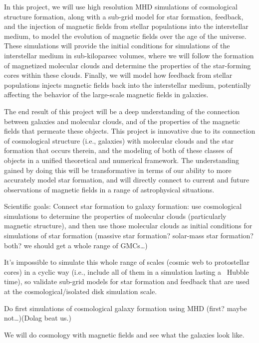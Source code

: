 In this project, we will use high resolution MHD simulations of
cosmological structure formation, along with a sub-grid model for star
formation, feedback, and the injection of magnetic fields from stellar
populations into the interstellar medium, to model the evolution of
magnetic fields over the age of the universe.  These simulations will
provide the initial conditions for simulations of the
interstellar medium in sub-kiloparsec volumes, where we will follow
the formation of magnetized molecular clouds and determine the
properties of the star-forming cores within these clouds.  Finally, we
will model how feedback from stellar populations injects magnetic
fields back into the interstellar medium, potentially affecting the
behavior of the large-scale magnetic fields in galaxies.

The end result of this project will be a deep understanding of the
connection between galaxies and molecular clouds, and of the
properties of the magnetic fields that permeate these objects.  This
project is innovative due to its connection of cosmological structure
(i.e., galaxies) with molecular clouds and the star formation that
occurs therein, and the modeling of both of these classes of objects
in a unified theoretical and numerical framework.  The understanding
gained by doing this will be transformative in terms of our ability to
more accurately model star formation, and will directly connect to
current and future observations of magnetic fields in a range of
astrophysical situations.



Scientific goals:
Connect star formation to galaxy formation: use cosmological simulations to
determine the properties of molecular clouds (particularly magnetic structure),
and then use those molecular clouds as initial conditions for simulations of
star formation (massive star formation?  solar-mass star formation?  both? we
should get a whole range of GMCs…)

It’s impossible to simulate this whole range of scales (cosmic web to
protostellar cores) in a cyclic way (i.e., include all of them in a simulation
lasting a ~Hubble time), so validate sub-grid models for star formation and
feedback that are used at the cosmological/isolated disk simulation scale.

Do first simulations of cosmological galaxy formation using MHD (first?  maybe
not…)(Dolag beat us.)

\citep{Beck12}

We will do cosmology with magnetic fields and see what the galaxies look like.

